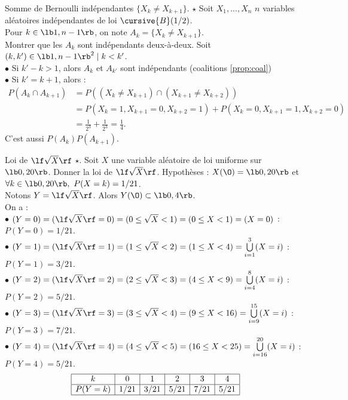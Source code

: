 \documentclass[11pt]{article}
\begin{document}
\begin{exercice}{Somme de Bernoulli indépendantes $\{X_k\neq X_{k+1}\}$. $\star$}{}
    Soit $X_1,...,X_n$ $n$ variables aléatoires indépendantes de loi $\cursive{B}(1/2)$.\\
    Pour $k\in\lb1,n-1\rb$, on note $A_k=\{X_k\neq X_{k+1}\}$.\\
    Montrer que les $A_k$ sont indépendants deux-à-deux.
    \tcblower
    Soit $(k,k')\in\lb1,n-1\rb^2 \mid k < k'$.\\
    $\bullet$ Si $k'-k>1$, alors $A_k$ et $A_{k'}$ sont indépendants (coalitions \ref{prop:coal})\\
    $\bullet$ Si $k'=k+1$, alors :
    \begin{align*}
        P(A_k\cap A_{k+1})&=P((X_k\neq X_{k+1})\cap(X_{k+1}\neq X_{k+2}))\\
        &=P(X_k=1,X_{k+1}=0,X_{k+2}=1)+P(X_k=0,X_{k+1}=1,X_{k+2}=0)\\
        &=\frac{1}{2^3}+\frac{1}{2^3}=\frac{1}{4}.
    \end{align*}
    C'est aussi $P(A_k)P(A_{k+1})$.
\end{exercice}

\begin{exercice}{Loi de $\lf \sqrt{X} \rf$ $\star$.}{}
    Soit $X$ une variable aléatoire de loi uniforme sur $\lb0,20\rb$. Donner la loi de $\lf\sqrt{X}\rf$.
    \tcblower
    Hypothèses : $X(\O)=\lb0,20\rb$ et $\forall k \in \lb0,20\rb,~P(X=k)=1/21$.\\
    Notons $Y=\lf\sqrt{X}\rf$. Alors $Y(\O)\subset\lb0,4\rb$.\\
    On a :\\
    $\bullet$ $(Y=0)=(\lf\sqrt{X}\rf=0)=(0\leq\sqrt{X}<1)=(0\leq X<1)=(X=0)$ : $P(Y=0)=1/21$.\\
    $\bullet$ $(Y=1)=(\lf\sqrt{X}\rf=1)=(1\leq\sqrt{X}<2)=(1\leq X<4)=\bigcup\limits_{i=1}^3(X=i)$ : $P(Y=1)=3/21$.\\
    $\bullet$ $(Y=2)=(\lf\sqrt{X}\rf=2)=(2\leq\sqrt{X}<3)=(4\leq X<9)=\bigcup\limits_{i=4}^8(X=i)$ : $P(Y=2)=5/21$.\\
    $\bullet$ $(Y=3)=(\lf\sqrt{X}\rf=3)=(3\leq\sqrt{X}<4)=(9\leq X<16)=\bigcup\limits_{i=9}^{15}(X=i)$ : $P(Y=3)=7/21$.\\
    $\bullet$ $(Y=4)=(\lf\sqrt{X}\rf=4)=(4\leq\sqrt{X}<5)=(16 \leq X < 25)=\bigcup\limits_{i=16}^{20}(X=i)$ : $P(Y=4)=5/21$.
    \begin{eqnarray*}
        \begin{array}{|c|c|c|c|c|c|}
            \hline
            k & 0 & 1 & 2 & 3 & 4\\
            \hline
            P(Y=k) & 1/21 & 3/21 & 5/21 & 7/21 & 5/21\\
            \hline
        \end{array}
    \end{eqnarray*}
\end{exercice}
\end{document}
